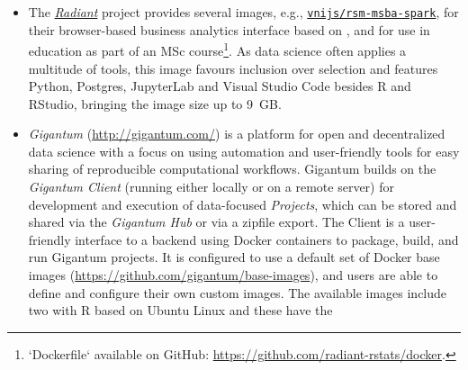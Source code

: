 \begin{itemize}
  \texttt{rocker/ml} in Section~), and it also
  configures the  package \citep{cran_reticulate}.
  The image uses a base image with \emph{all packages from CRAN},
  \texttt{gcr.io/kaggle-images/rcran}, which requires a Google Cloud
  Build because Docker~Hub would time
  out\footnote{Originally, a stacked collection of over 20~images with automated builds on Docker~Hub was used, see \href{https://web.archive.org/web/20190606043353/http://blog.kaggle.com/2016/02/05/how-to-get-started-with-data-science-in-containers/}{https://web.archive.org/web/20190606043353/http://blog.kaggle.com/2016/02/05/how-to-get-started-with-data-science-in-containers/} and \href{https://hub.docker.com/r/kaggle/rcran/dockerfile}{https://hub.docker.com/r/kaggle/rcran/dockerfile}}.
  The final extracted image size is over 25~GB, which calls into
  question whether having everything available is actually convenient.
\item
  The \href{https://radiant-rstats.github.io/docs/}{\emph{Radiant}}
  project provides several images, e.g.,
  \href{https://hub.docker.com/r/vnijs/rsm-msba-spark}{\texttt{vnijs/rsm-msba-spark}},
  for their browser-based business analytics interface based on
   \citep{cran_shiny}, and for use in education as part
  of an MSc
  course\footnote{`Dockerfile` available on GitHub: \href{https://github.com/radiant-rstats/docker}{https://github.com/radiant-rstats/docker}.}.
  As data science often applies a multitude of tools, this image favours
  inclusion over selection and features Python, Postgres, JupyterLab and
  Visual Studio Code besides R and RStudio, bringing the image size up
  to 9~GB.
\item
  \emph{Gigantum} (\url{http://gigantum.com/}) is a platform for open
  and decentralized data science with a focus on using automation and
  user-friendly tools for easy sharing of reproducible computational
  workflows. Gigantum builds on the \emph{Gigantum Client} (running
  either locally or on a remote server) for development and execution of
  data-focused \emph{Projects}, which can be stored and shared via the
  \emph{Gigantum Hub} or via a zipfile export. The Client is a
  user-friendly interface to a backend using Docker containers to
  package, build, and run Gigantum projects. It is configured to use a
  default set of Docker base images
  (\url{https://github.com/gigantum/base-images}), and users are able to
  define and configure their own custom images. The available images
  include two with R based on Ubuntu Linux and these have the

\end{itemize}
